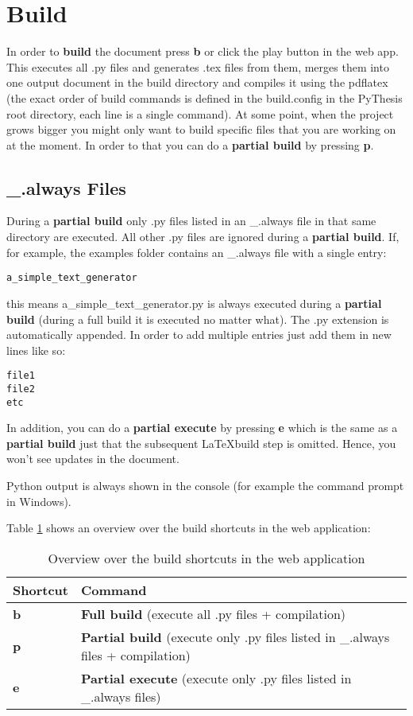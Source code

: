 \section{Build}
\label{sec:build}
In order to \textbf{build} the document press \textbf{b} or click the play button in the web app. This executes all .py files and generates .tex files from them, merges them into one output document in the build directory and compiles it using the pdflatex (the exact order of build commands is defined in the build.config in the PyThesis root directory, each line is a single command). At some point, when the project grows bigger you might only want to build specific files that you are working on at the moment. In order to that you can do a \textbf{partial build} by pressing \textbf{p}.  

\subsection{\_.always Files}
During a \textbf{partial build} only .py files listed in an \_.always file in that same directory are executed. All other .py files are ignored during a \textbf{partial build}. If, for example, the examples folder contains an \_.always file with a single entry: 
\begin{verbatim}
a_simple_text_generator
\end{verbatim}
this means a\_simple\_text\_generator.py is always executed during a \textbf{partial build} (during a full build it is executed no matter what). The .py extension is automatically appended. In order to add multiple entries just add them in new lines like so:
\begin{verbatim}
file1
file2
etc
\end{verbatim}
In addition, you can do a \textbf{partial execute} by pressing \textbf{e} which is the same as a \textbf{partial build} just that the subsequent \LaTeX build step is omitted. Hence, you won't see updates in the document. 

Python output is always shown in the console (for example the command prompt in Windows).

Table \ref{tab:shortcuts} shows an overview over the build shortcuts in the web application:
\begin{table}[H]
\begin{center}
\begin{tabular}{l|l}
\toprule
Shortcut & Command \\
\midrule
\textbf{b} & \textbf{Full build} (execute all .py files + compilation) \\
\textbf{p} & \textbf{Partial build} (execute only .py files listed in \_.always files + compilation) \\
\textbf{e} & \textbf{Partial execute} (execute only .py files listed in \_.always files) \\
\bottomrule
\end{tabular}
\caption{Overview over the build shortcuts in the web application}
\label{tab:shortcuts}
\end{center}
\end{table}
